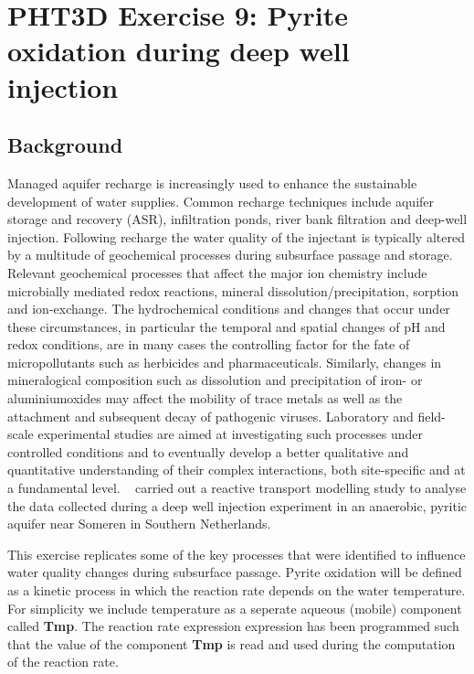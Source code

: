 \newpage
\section[PHT3D Exercise 9: Pyrite oxidation during deep well injection]{PHT3D Exercise 9: Pyrite oxidation during deep well injection}
\subsection[Background]{Background}

Managed aquifer recharge is increasingly used to enhance the sustainable development of water supplies. Common recharge techniques include aquifer storage and recovery (ASR), infiltration ponds, river bank filtration and deep-well injection. Following recharge the water quality of the injectant is typically altered by a multitude of geochemical processes during subsurface passage and storage. Relevant geochemical processes that affect the major ion chemistry include microbially mediated redox reactions, mineral dissolution/precipitation, sorption and ion-exchange. The hydrochemical conditions and changes that occur under these circumstances, in particular the temporal and spatial changes of pH and redox conditions, are in many cases the controlling factor for the fate of micropollutants such as herbicides and pharmaceuticals. Similarly, changes in mineralogical composition such as dissolution and precipitation of iron- or aluminiumoxides may affect the mobility of trace metals as well as the attachment and subsequent decay of pathogenic viruses. Laboratory and field-scale experimental studies are aimed at investigating such processes under controlled conditions and to eventually develop a better qualitative and quantitative understanding of their complex interactions, both site-specific and at a fundamental level. \
\cite{prommer_stuyfzand_2005} carried out a reactive transport 
modelling study to analyse the data collected during a deep well 
injection experiment in an anaerobic, pyritic aquifer near Someren in Southern Netherlands. 

This exercise replicates some of the key processes that were identified
to influence water quality changes during subsurface passage. 
Pyrite oxidation will be defined as a kinetic process in which the
reaction rate depends on the water temperature. 
For simplicity we include temperature as a seperate aqueous (mobile) component
called {\color{red} \textbf{Tmp}}.
The reaction rate expression expression has been programmed such 
that the value of the component {\color{red} \textbf{Tmp}} is read
and used during the computation of the reaction rate. 

